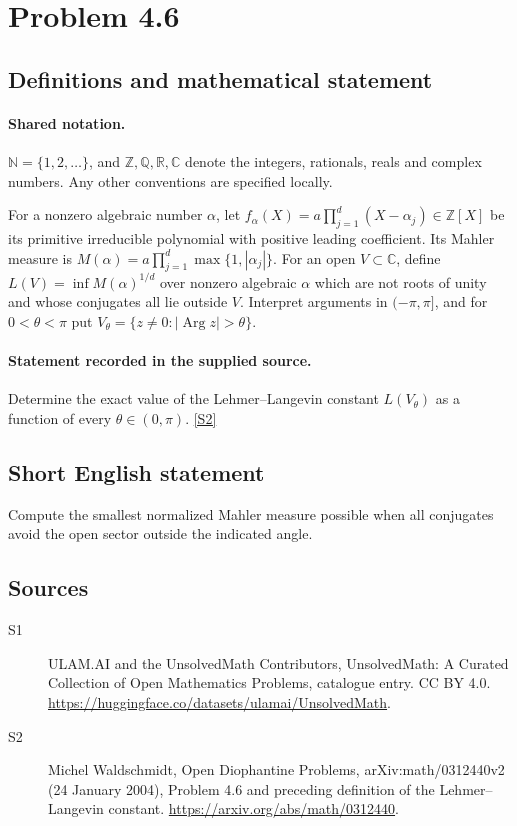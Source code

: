 \documentclass[11pt]{article}
\newcommand{\sref}[2]{\hyperlink{source:#1:#2}{[S#2]}}
\begin{document}
\section{Problem 4.6}\label{statement}

\subsection{Definitions and mathematical statement}

\paragraph{Shared notation.}$\mathbb N=\{1,2,\ldots\}$, and $\mathbb Z,\mathbb Q,\mathbb R,\mathbb C$ denote the integers, rationals, reals and complex numbers. Any other conventions are specified locally.


For a nonzero algebraic number $\alpha$, let $f_\alpha(X)=a\prod_{j=1}^d(X-\alpha_j)\in\mathbb Z[X]$ be its primitive irreducible polynomial with positive leading coefficient. Its Mahler measure is $M(\alpha)=a\prod_{j=1}^d\max\{1,|\alpha_j|\}$. For an open $V\subset\mathbb C$, define $L(V)=\inf M(\alpha)^{1/d}$ over nonzero algebraic $\alpha$ which are not roots of unity and whose conjugates all lie outside $V$. Interpret arguments in $(-\pi,\pi]$, and for $0<\theta<\pi$ put $V_\theta=\{z\ne0:|\operatorname{Arg}z|>\theta\}$.
\paragraph{Statement recorded in the supplied source.}
Determine the exact value of the Lehmer--Langevin constant $L(V_\theta)$ as a function of every $\theta\in(0,\pi)$. \sref{statement}{2}
\subsection{Short English statement}
Compute the smallest normalized Mahler measure possible when all conjugates avoid the open sector outside the indicated angle.
\subsection{Sources}
\begin{description}
\item[\hypertarget{source:statement:1}{S1}] ULAM.AI and the UnsolvedMath Contributors, UnsolvedMath: A Curated Collection of Open Mathematics Problems, catalogue entry. CC BY 4.0. \url{https://huggingface.co/datasets/ulamai/UnsolvedMath}.
\item[\hypertarget{source:statement:2}{S2}] Michel Waldschmidt, Open Diophantine Problems, arXiv:math/0312440v2 (24 January 2004), Problem 4.6 and preceding definition of the Lehmer--Langevin constant. \url{https://arxiv.org/abs/math/0312440}.
\end{description}
\label{end:statement}
\end{document}
